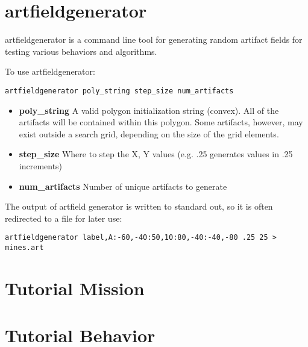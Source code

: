 \section{artfieldgenerator}
\label{app:artfieldgenerator}
artfieldgenerator is a command line tool for generating random artifact fields for testing various behaviors and algorithms.

To use artfieldgenerator:

{\tt artfieldgenerator poly\_string step\_size num\_artifacts}

\begin{itemize}
\item {\bf poly\_string} A valid polygon initialization string (convex).  All of the artifacts will be contained within this polygon.  Some artifacts, however, may exist outside a search grid, depending on the size of the grid elements.
\item {\bf step\_size} Where to step the X, Y values (e.g. .25 generates values in .25 increments)
\item {\bf num\_artifacts} Number of unique artifacts to generate
\end{itemize}

The output of artfield generator is written to standard out, so it is often redirected to a file for later use:

{\tt artfieldgenerator label,A:-60,-40:50,10:80,-40:-40,-80 .25 25 > mines.art}

\section{Tutorial Mission}
\label{app:tutorialmission}


\section{Tutorial Behavior}
\label{app:tutorialbehavior}

